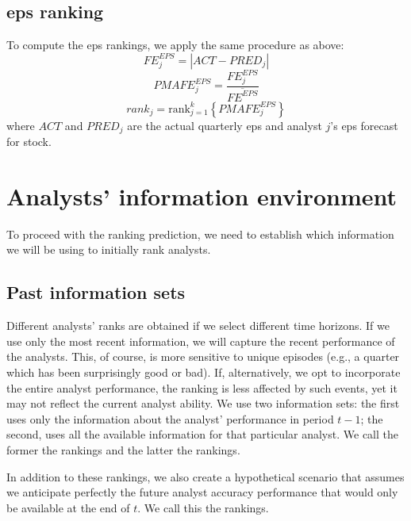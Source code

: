 \documentclass[a4paper,twoside,12pt,openright,notitlepage]{report}\usepackage[]{graphicx}\usepackage[]{color}
\begin{document}
\subsection{\gls{eps} ranking}
\label{ch4:sec-eps}
To compute the \gls{eps} rankings, we apply the same procedure as above:
\begin{equation}
	FE_{j}^{EPS}=|{ACT-PRED_{j}}|
\end{equation}
\begin{equation}
	PMAFE_{j}^{EPS}= \frac{FE_{j}^{EPS}}{\overline{FE^{EPS}}}
\end{equation}
\begin{equation}
	\label{ch4-eps:rank}
	rank_{j}=\mathrm{rank}_{j=1}^{k} \left\{ PMAFE_{j}^{EPS} \right\}
\end{equation}
where $ACT$ and $PRED_{j}$ are the actual quarterly \gls{eps} and  analyst $j$'s \gls{eps} forecast for stock.




\section{Analysts' information environment}
\label{ch4:inf-set}
To proceed with the ranking prediction, we need to establish which information we  will be using to initially rank analysts.

\subsection{Past information sets}
Different analysts' ranks are obtained  if we select different time horizons. If we use only the most  recent information, we will capture the recent performance of the analysts. This, of course, is more sensitive to unique episodes (e.g., a quarter which has been surprisingly good or bad). If, alternatively, we opt to incorporate the entire analyst performance, the ranking is less affected by such events, yet it may not reflect the current analyst ability. We use two information sets: the first uses only the  information about the analyst' performance in period $t-1$; the second, uses all the available  information for that particular analyst. We call the former the \naive{} rankings and the latter the  rankings.

In addition to these rankings,  we also create a hypothetical scenario that assumes we anticipate perfectly the future analyst accuracy performance  that would only be available at the end of $t$.
We call this the \tr{} rankings.
\end{document}
